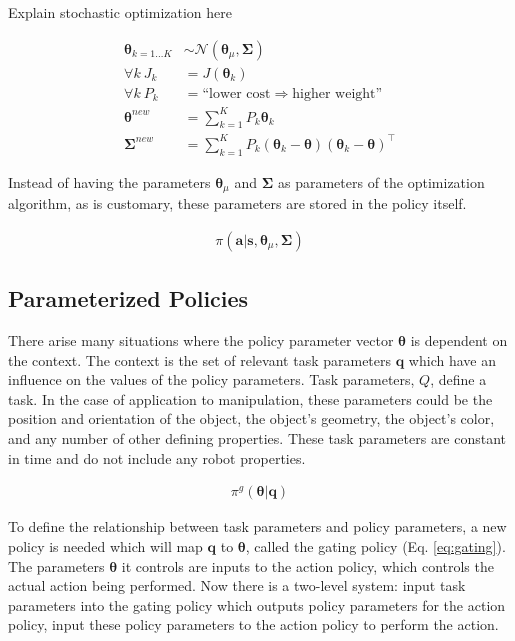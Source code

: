 \documentclass[12pt]{article}
\newcommand{\polg}   {\ensuremath{\pi^g}}
\newcommand{\act}    {\ensuremath{\mathbf{a}}}
\newcommand{\sta}    {\ensuremath{\mathbf{s}}}
\newcommand{\taskp}  {\ensuremath{\mathbf{q}}}
\newcommand{\app}    {\ensuremath{\bm{\theta}}}
\newcommand{\taskpsp}{\ensuremath{Q}}
\newcommand{\covar}  {\ensuremath{\bm{\Sigma}}}
\begin{document}
\color{red}Explain stochastic optimization here \color{black}


\begin{align*}
\app_{k=1\dots K} & {\sim}\mathcal{N}({\app_\mu},{\covar})\\
\forall k~J_k & = J(\app_k)\\
\forall k~P_k & = \mbox{``lower cost} \Rightarrow \mbox{higher weight''}\\
\app^{new} & = \sum_{k=1}^{K} P_k \app_k\\
\covar^{new} & = \sum_{k=1}^{K}P_k(\app_k-\app)(\app_k-\app)^\intercal
\end{align*}

Instead of having the parameters $\app_\mu$ and $\covar$ as parameters of the optimization algorithm, as is customary, these parameters are stored in the policy itself. 

\begin{align}
\label{eq:opt}\pi(\act|\sta,\app_\mu,\covar)
\end{align}



\subsection{Parameterized Policies}

There arise many situations where the  policy parameter vector $\app$ is dependent on the context. The context is the set of relevant task parameters $\taskp$ which have an influence on the values of the policy parameters. Task parameters, \emph{\taskpsp}, define a task. In the case of application to manipulation, these parameters could be the position and orientation of the object, the object's geometry, the object's color, and any number of other defining properties. These task parameters are constant in time and do not include any robot properties. 

\begin{align}
\label{eq:gating}\polg(\app|\taskp)
\end{align}

To define the relationship between task parameters and policy parameters, a new policy is needed which will map $\taskp$ to $\app$, called the gating policy (Eq. \ref{eq:gating}). The parameters $\app$ it controls are inputs to the action policy, which controls the actual action being performed. Now there is a two-level system: input task parameters into the gating policy which outputs policy parameters for the action policy, input these policy parameters to the action policy to perform the action. 
\end{document}
